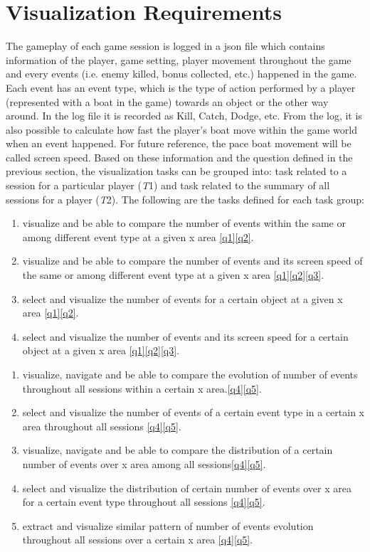 \section{Visualization Requirements}

The gameplay of each game session is logged in a json file which contains information of the player, game setting, player movement throughout the game and every events (i.e. enemy killed, bonus collected, etc.) happened in the game. Each event has an event type, which is the type of action performed by a player (represented with a boat in the game) towards an object or the other way around. In the log file it is recorded as Kill, Catch, Dodge, etc. From the log, it is also possible to calculate how fast the player's boat move within the game world when an event happened. For future reference, the pace boat movement will be called screen speed. Based on these information and the question defined in the previous section, the visualization tasks can be grouped into: task related to a session for a particular player (\textit{T}1) and task related to the summary of all sessions for a player (\textit{T}2). The following are the tasks defined for each task group:
\newcommand{\task}[2]{$#1 #2$}
\begin{enumerate}[label=\textbf{(\task{T1.}{\arabic*})}]
\item \label{t11} visualize and be able to compare the number of events within the same or among different event type at a given x area \ref{q1}\ref{q2}.
\item \label{t12} visualize and be able to compare the number of events and its screen speed of the same or among different event type at a given x area \ref{q1}\ref{q2}\ref{q3}.
\item \label{t13} select and visualize the number of events for a certain object at a given x area \ref{q1}\ref{q2}.
\item \label{t14} select and visualize the number of events and its screen speed for a certain object at a given x area \ref{q1}\ref{q2}\ref{q3}.
\end{enumerate}

\newcommand{\test}[2]{$#1 #2$}
\begin{enumerate}[label=\textbf{(\test{T2.}{\arabic*})}]
\item \label{t21} visualize, navigate and be able to compare the evolution of number of events throughout all sessions within a certain x area.\ref{q4}\ref{q5}.
\item \label{t22} select and visualize the number of events of a certain event type in a certain x area throughout all sessions \ref{q4}\ref{q5}.
\item \label{t23} visualize, navigate and be able to compare the distribution of a certain number of events over x area among all sessions\ref{q4}\ref{q5}.
\item \label{t24} select and visualize the distribution of certain number of events over x area for a certain event type throughout all sessions \ref{q4}\ref{q5}.
\item \label{t25} extract and visualize similar pattern of number of events evolution throughout all sessions over a certain x area \ref{q4}\ref{q5}.
\end{enumerate}
